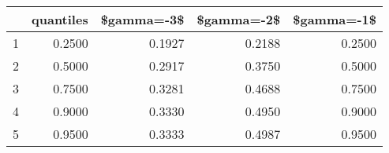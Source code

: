 \begin{table}[ht]
\centering
\begin{tabular}{rrrrr}
  \hline
 & quantiles & \$gamma=-3\$ & \$gamma=-2\$ & \$gamma=-1\$ \\ 
  \hline
1 & 0.2500 & 0.1927 & 0.2188 & 0.2500 \\ 
  2 & 0.5000 & 0.2917 & 0.3750 & 0.5000 \\ 
  3 & 0.7500 & 0.3281 & 0.4688 & 0.7500 \\ 
  4 & 0.9000 & 0.3330 & 0.4950 & 0.9000 \\ 
  5 & 0.9500 & 0.3333 & 0.4987 & 0.9500 \\ 
   \hline
\end{tabular}
\end{table}
